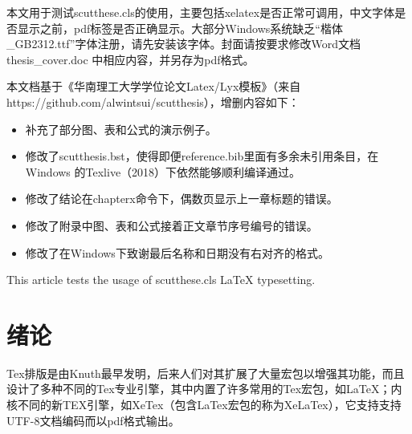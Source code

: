 \documentclass[unicode,pdfcover]{scutthesis}
\begin{document}
\maketitle

\frontmatter

\begin{abstractCN}
本文用于测试scutthese.cls的使用，主要包括xelatex是否正常可调用，中文字体是否显示之前，pdf标签是否正确显示。大部分Windows系统缺乏“楷体\_GB2312.ttf”字体注册，请先安装该字体。封面请按要求修改Word文档 thesis\_cover.doc 中相应内容，并另存为pdf格式。

本文档基于《华南理工大学学位论文Latex/Lyx模板》\cite{2016Scutthesis}（来自https://github.com/alwintsui/scutthesis），增删内容如下：
\begin{itemize}
  \item 补充了部分图、表和公式的演示例子。
  \item 修改了scutthesis.bst，使得即便reference.bib里面有多余未引用条目，在Windows 的Texlive（2018）下依然能够顺利编译通过。
  \item 修改了结论在chapterx命令下，偶数页显示上一章标题的错误。
  \item 修改了附录中图、表和公式接着正文章节序号编号的错误。
  \item 修改了在Windows下致谢最后名称和日期没有右对齐的格式。
\end{itemize}


\end{abstractCN}

\begin{abstractEN}
This article tests the usage of scutthese.cls \LaTeX{} typesetting.
\end{abstractEN}


\tableofcontents{}%



\mainmatter

\chapter{绪论}
Tex排版\cite{knuth1986thetexbook}是由Knuth最早发明，后来人们对其扩展了大量宏包以增强其功能，而且设计了多种不同的Tex专业引擎，其中内置了许多常用的Tex宏包，如\LaTeX{}\cite{goossens1994thelatex}；内核不同的新TEX引擎，如XeTex（包含LaTex宏包的称为XeLaTex），它支持支持UTF-8文档编码而以pdf格式输出。
\end{document}
